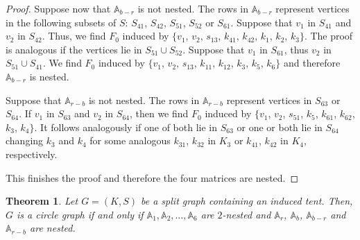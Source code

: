 \documentclass[12pt]{book}
\theoremstyle{plain}
\newtheorem{teo}{Theorem}[chapter]
\theoremstyle{remark}
\begin{document}
\begin{proof}
	Suppose now that $\mathbb A_{b-r}$ is not nested. The rows in $\mathbb A_{b-r}$ represent vertices in the following subsets of $S$: $S_{41}$, $S_{42}$, $S_{51}$, $S_{52}$ or $S_{61}$.
	Suppose that $v_1$ in $S_{41}$ and $v_2$ in $S_{42}$. Thus, we find $F_0$ induced by $\{ v_1$, $v_2$, $s_{13}$, $k_{41}$, $k_{42}$, $k_{1}$, $k_{2}$, $k_{3} \}$. The proof is analogous if the vertices lie in $S_{51} \cup S_{52}$.
	Suppose that $v_1$ in $S_{61}$, thus $v_2$ in $S_{51} \cup S_{41}$. We find $F_0$ induced by $\{ v_1$, $v_2$, $s_{13}$, $k_{11}$, $k_{12}$, $k_{3}$, $k_{5}$, $k_{6} \}$ and therefore $\mathbb A_{b-r}$ is nested.
	
	 Suppose that $\mathbb A_{r-b}$ is not nested. The rows in $\mathbb A_{r-b}$ represent vertices in $S_{63}$ or $S_{64}$. If $v_1$ in $S_{63}$ and $v_2$ in $S_{64}$, then we find $F_0$ induced by $\{ v_1$, $v_2$, $s_{51}$, $k_{5}$, $k_{61}$, $k_{62}$, $k_{3}$, $k_{4} \}$. It follows analogously if one of both lie in $S_{63}$ or one or both lie in $S_{64}$ changing $k_3$ and $k_4$ for some analogous $k_{31}$, $k_{32}$ in $K_3$ or $k_{41}$, $k_{42}$ in $K_4$, respectively.
	
	
	This finishes the proof and therefore the four matrices are nested.
\end{proof}


\begin{teo} \label{teo:finalteo_tent}
	Let $G=(K,S)$ be a split graph containing an induced tent. Then, $G$ is a circle graph if and only if $\mathbb A_1,\mathbb A_2,\ldots,\mathbb A_6$ are $2$-nested and $\mathbb A_r$, $\mathbb A_b$, $\mathbb A_{b-r}$ and $\mathbb A_{r-b}$ are nested.
\end{teo}
\end{document}
